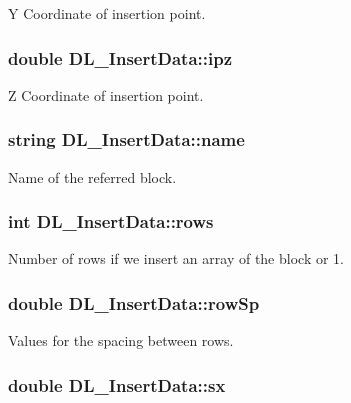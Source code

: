 Y Coordinate of insertion point. \hypertarget{structDL__InsertData_a8e7f2d90779ab08c9b85ee70224cffd4}{
\subsubsection[{ipz}]{\setlength{\rightskip}{0pt plus 5cm}double D\-L\-\_\-\-Insert\-Data\-::ipz}}\label{structDL__InsertData_a8e7f2d90779ab08c9b85ee70224cffd4}
Z Coordinate of insertion point. \hypertarget{structDL__InsertData_a4c9641ecc8dfaf3372d31ca68bb5e66e}{
\subsubsection[{name}]{\setlength{\rightskip}{0pt plus 5cm}string D\-L\-\_\-\-Insert\-Data\-::name}}\label{structDL__InsertData_a4c9641ecc8dfaf3372d31ca68bb5e66e}
Name of the referred block. \hypertarget{structDL__InsertData_a8fa9228cac1d31f0f1208ecef03b693e}{
\subsubsection[{rows}]{\setlength{\rightskip}{0pt plus 5cm}int D\-L\-\_\-\-Insert\-Data\-::rows}}\label{structDL__InsertData_a8fa9228cac1d31f0f1208ecef03b693e}
Number of rows if we insert an array of the block or 1. \hypertarget{structDL__InsertData_a71f591f05ad0f379f24bf04334e55941}{
\subsubsection[{row\-Sp}]{\setlength{\rightskip}{0pt plus 5cm}double D\-L\-\_\-\-Insert\-Data\-::row\-Sp}}\label{structDL__InsertData_a71f591f05ad0f379f24bf04334e55941}
Values for the spacing between rows. \hypertarget{structDL__InsertData_a5b6425a71fbe72ae95a5e056cfb71234}{
\subsubsection[{sx}]{\setlength{\rightskip}{0pt plus 5cm}double D\-L\-\_\-\-Insert\-Data\-::sx}}\label{structDL__InsertData_a5b6425a71fbe72ae95a5e056cfb71234}
